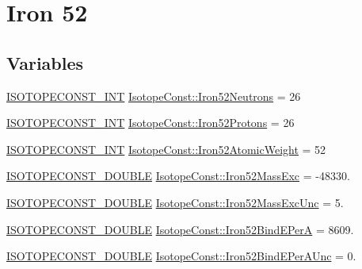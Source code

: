 \hypertarget{group___isotope_const-_iron-_fe52}{}\section{Iron 52}
\label{group___isotope_const-_iron-_fe52}
\subsection*{Variables}
\begin{DoxyCompactItemize}
\item 
\mbox{\hyperlink{group___isotope_const-_macros_ga5f18360b3e99483a35c32d789e62621c}{I\+S\+O\+T\+O\+P\+E\+C\+O\+N\+S\+T\+\_\+\+I\+NT}} \mbox{\hyperlink{group___isotope_const-_iron-_fe52_ga322a1ecd92645c7b3528009836accd46}{Isotope\+Const\+::\+Iron52\+Neutrons}} = 26
\item 
\mbox{\hyperlink{group___isotope_const-_macros_ga5f18360b3e99483a35c32d789e62621c}{I\+S\+O\+T\+O\+P\+E\+C\+O\+N\+S\+T\+\_\+\+I\+NT}} \mbox{\hyperlink{group___isotope_const-_iron-_fe52_ga6a411df34acafec276e482aefc7fe568}{Isotope\+Const\+::\+Iron52\+Protons}} = 26
\item 
\mbox{\hyperlink{group___isotope_const-_macros_ga5f18360b3e99483a35c32d789e62621c}{I\+S\+O\+T\+O\+P\+E\+C\+O\+N\+S\+T\+\_\+\+I\+NT}} \mbox{\hyperlink{group___isotope_const-_iron-_fe52_ga25826a3f5f36b53561bca3b4fa711b23}{Isotope\+Const\+::\+Iron52\+Atomic\+Weight}} = 52
\item 
\mbox{\hyperlink{group___isotope_const-_macros_ga8f45a7272ce02c0b4c65c44636ed719a}{I\+S\+O\+T\+O\+P\+E\+C\+O\+N\+S\+T\+\_\+\+D\+O\+U\+B\+LE}} \mbox{\hyperlink{group___isotope_const-_iron-_fe52_ga75805aa2bcd4a49fd51d0b4dbc642b1d}{Isotope\+Const\+::\+Iron52\+Mass\+Exc}} = -\/48330.
\item 
\mbox{\hyperlink{group___isotope_const-_macros_ga8f45a7272ce02c0b4c65c44636ed719a}{I\+S\+O\+T\+O\+P\+E\+C\+O\+N\+S\+T\+\_\+\+D\+O\+U\+B\+LE}} \mbox{\hyperlink{group___isotope_const-_iron-_fe52_ga843b34614a5d0af1f8200cb7ab2ea7ba}{Isotope\+Const\+::\+Iron52\+Mass\+Exc\+Unc}} = 5.
\item 
\mbox{\hyperlink{group___isotope_const-_macros_ga8f45a7272ce02c0b4c65c44636ed719a}{I\+S\+O\+T\+O\+P\+E\+C\+O\+N\+S\+T\+\_\+\+D\+O\+U\+B\+LE}} \mbox{\hyperlink{group___isotope_const-_iron-_fe52_ga71512877087382f04efefe69dea096ef}{Isotope\+Const\+::\+Iron52\+Bind\+E\+PerA}} = 8609.
\item 
\mbox{\hyperlink{group___isotope_const-_macros_ga8f45a7272ce02c0b4c65c44636ed719a}{I\+S\+O\+T\+O\+P\+E\+C\+O\+N\+S\+T\+\_\+\+D\+O\+U\+B\+LE}} \mbox{\hyperlink{group___isotope_const-_iron-_fe52_ga191497c9e96fdda99a7ca58c4aae4a7b}{Isotope\+Const\+::\+Iron52\+Bind\+E\+Per\+A\+Unc}} = 0.

\end{DoxyCompactItemize}
